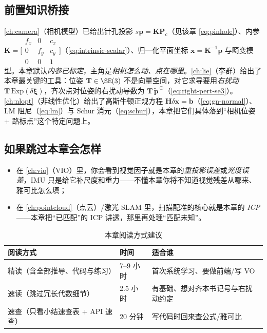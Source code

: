 \subsection*{前置知识桥接}
\cref{ch:camera}（相机模型）已给出针孔投影 $s\mathbf{p}=\mathbf{K}\mathbf{P}_c$（见该章 \cref{eq:pinhole}）、内参 $\mathbf{K}=\big[\begin{smallmatrix}f_x&0&c_x\\0&f_y&c_y\\0&0&1\end{smallmatrix}\big]$（\cref{eq:intrinsic-scalar}）、归一化平面坐标 $\mathbf{x}=\mathbf{K}^{-1}\mathbf{p}$ 与畸变模型。本章默认\emph{内参已标定}，主角是\emph{相机怎么动、点在哪里}。\cref{ch:lie}（李群）给出了本章最关键的工具：位姿 $\mathbf{T}\in\SE(3)$ 不是向量空间，对它求导要用\emph{右扰动} $\mathbf{T}\,\mathrm{Exp}(\delta\boldsymbol{\xi})$，齐次点对位姿的右扰动导数为 $\mathbf{T}\,\tilde{\mathbf{p}}^{\,\odot}$（\cref{eq:right-pert-se3}）。\cref{ch:nlopt}（非线性优化）给出了高斯牛顿正规方程 $\mathbf{H}\delta\mathbf{x}=\mathbf{b}$（\cref{eq:gn-normal}）、LM 阻尼（\cref{eq:lm}）与 Schur 消元（\cref{eq:schur}），本章把它们具体落到“相机位姿 + 路标点”这个特定问题上。

\subsection*{如果跳过本章会怎样}
\begin{itemize}
  \item 在 \cref{ch:vio}（VIO）里，你会看到视觉因子就是本章的\emph{重投影误差}或\emph{光度误差}，IMU 只是给它补尺度和重力——不懂本章你将不知道视觉残差从哪来、雅可比怎么填；
  \item 在 \cref{ch:pointcloud}（点云）/激光 SLAM 里，扫描配准的核心就是本章的 \emph{ICP}——本章把“已匹配”的 ICP 讲透，那里再处理“匹配未知”。
\end{itemize}

\begin{table}[H]\centering\small
\caption{本章阅读方式建议}
\label{tab:vo-reading}
\begin{tabular}{lll}
\toprule
阅读方式 & 时间 & 适合谁 \\
\midrule
精读（含全部推导、代码与练习） & 7--9 小时 & 首次系统学习、要做前端/写 VO \\
速读（跳过冗长代数细节） & 2.5 小时 & 有基础、想对齐本书记号与右扰动约定 \\
速查（只看小结速查表 + API 速查） & 20 分钟 & 写代码时回来查公式/雅可比 \\
\bottomrule
\end{tabular}
\end{table}

